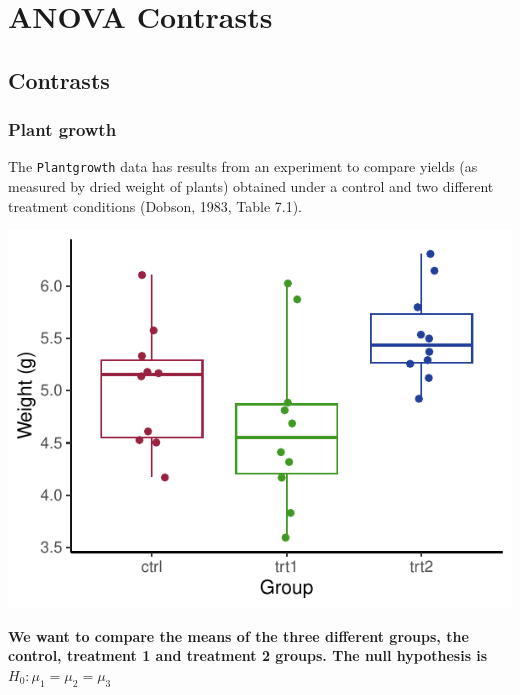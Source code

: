 \documentclass[a4paper]{article}\usepackage[]{graphicx}\usepackage[]{xcolor}
\makeatletter
\def\maxwidth{ %
  \ifdim\Gin@nat@width>\linewidth
    \linewidth
  \else
    \Gin@nat@width
  \fi
}
\makeatother
\begin{document}
\section{ANOVA Contrasts}\label{sec:21}
\subsection{Contrasts}
\subsubsection{Plant growth}
The \lstinline|Plantgrowth| data has results from an experiment to compare yields (as measured by dried weight of plants) obtained under a control and two different treatment conditions (Dobson, 1983, Table 7.1).
\begin{Schunk}


{\centering \includegraphics[width=\maxwidth]{figure/listings-unnamed-chunk-226-1} 

}

\end{Schunk}
\begin{greenbox}
	\textbf{We want to compare the means of the three different groups, the control, treatment 1 and treatment 2 groups. The null hypothesis is} \( H_0: \mu_1 = \mu_2 = \mu_3 \)
\end{greenbox}
\end{document}
